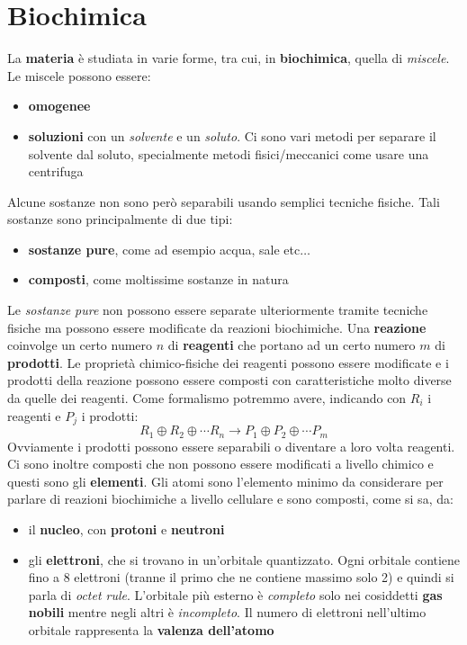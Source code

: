 \documentclass[a4paper,12pt, oneside]{book}
\begin{document}
\section{Biochimica}
La \textbf{materia} è studiata in varie forme, tra cui, in \textbf{biochimica},
quella di \textit{miscele}. Le miscele possono essere:
\begin{itemize}
  \item \textbf{omogenee}
  \item \textbf{soluzioni} con un \textit{solvente} e un \textit{soluto}. Ci
  sono vari metodi per separare il solvente dal soluto, specialmente metodi
  fisici/meccanici come usare una centrifuga
\end{itemize}
Alcune sostanze non sono però separabili usando semplici tecniche fisiche. Tali
sostanze sono principalmente di due tipi:
\begin{itemize}
  \item \textbf{sostanze pure}, come ad esempio acqua, sale etc$\ldots$ 
  \item \textbf{composti}, come moltissime sostanze in natura
\end{itemize}
Le \textit{sostanze pure} non possono essere separate ulteriormente tramite
tecniche fisiche ma possono essere modificate da reazioni biochimiche. Una
\textbf{reazione} coinvolge un certo numero $n$ di \textbf{reagenti} che portano
ad un certo numero $m$ di \textbf{prodotti}. Le proprietà chimico-fisiche dei
reagenti possono essere modificate e i prodotti della reazione possono essere
composti con caratteristiche molto diverse da quelle dei reagenti. Come
formalismo potremmo avere, 
indicando con $R_i$ i reagenti e $P_j$ i prodotti:
\[R_1\oplus R_2\oplus\cdots R_n\to P_1\oplus P_2\oplus\cdots P_m\]
Ovviamente i prodotti possono essere separabili o diventare a loro volta
reagenti. \\
Ci sono inoltre composti che non possono essere modificati a livello chimico e
questi sono gli \textbf{elementi}. Gli atomi sono l'elemento minimo da
considerare per parlare di 
reazioni biochimiche a livello cellulare e sono composti, come si sa, da:
\begin{itemize}
  \item il \textbf{nucleo}, con \textbf{protoni} e \textbf{neutroni}
  \item gli \textbf{elettroni}, che si trovano in un'orbitale quantizzato. Ogni
  orbitale contiene fino a 8 elettroni (tranne il primo che ne contiene massimo
  solo 2) e quindi si parla di \textit{octet rule}. L'orbitale più esterno è
  \textit{completo} solo nei cosiddetti \textbf{gas nobili} mentre negli altri è
  \textit{incompleto}. Il numero di elettroni nell'ultimo orbitale
  rappresenta la \textbf{valenza dell'atomo}
\end{itemize}
\end{document}
